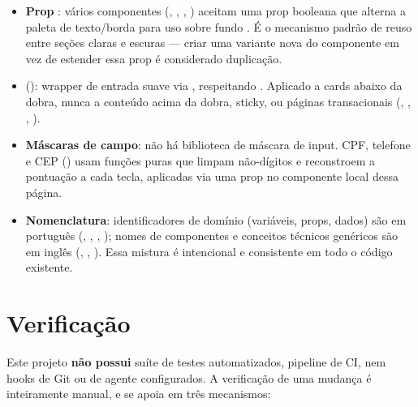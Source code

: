 \begin{itemize}
  \item \textbf{Prop }: vários componentes (,
        , , ) aceitam uma prop
        booleana  que alterna a paleta de texto/borda para uso sobre
        fundo . É o mecanismo padrão de reuso entre seções claras e
        escuras --- criar uma variante nova do componente em vez de estender
        essa prop é considerado duplicação.
  \item \textbf{} (): wrapper de entrada
        suave via , respeitando
        . Aplicado a cards abaixo da dobra, nunca a
        conteúdo acima da dobra, sticky, ou páginas transacionais
        (, , , ).
  \item \textbf{Máscaras de campo}: não há biblioteca de máscara de input.
        CPF, telefone e CEP () usam funções puras
        que limpam não-dígitos e reconstroem a pontuação a cada tecla,
        aplicadas via uma prop  no
        componente  local dessa página.
  \item \textbf{Nomenclatura}: identificadores de domínio (variáveis, props,
        dados) são em português (, , ,
        ); nomes de componentes e conceitos técnicos
        genéricos são em inglês (, , ). Essa
        mistura é intencional e consistente em todo o código existente.
\end{itemize}

\section{Verificação}
\label{sec:verificacao}

Este projeto \textbf{não possui} suíte de testes automatizados, pipeline de
CI, nem hooks de Git ou de agente configurados. A verificação de uma mudança é
inteiramente manual, e se apoia em três mecanismos:

